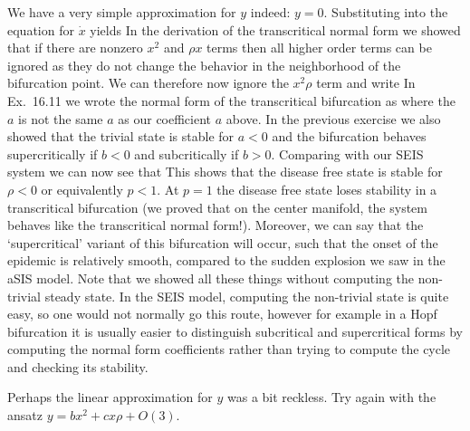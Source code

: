 \solution 
We have a very simple approximation for $y$ indeed: $y=0$. Substituting into the equation for $\dot{x}$ yields 
In the derivation of the transcritical normal form we showed that if there are nonzero $x^2$ and $\rho x$ terms then all higher order terms can be ignored as they do not change the behavior in the neighborhood of the bifurcation point. We can therefore now ignore the $x^2\rho$ term and write 
In Ex.~16.11 we wrote the normal form of the transcritical bifurcation as 
where the $a$ is not the same $a$ as our coefficient $a$ above. 
In the previous exercise we also showed that the trivial state is stable for $a<0$ and the bifurcation behaves supercritically if $b<0$ and subcritically if $b>0$. Comparing with our SEIS system we can now see that
This shows that the disease free state is stable for $\rho<0$ or equivalently $p<1$. At $p=1$ the disease free state loses stability in a transcritical bifurcation (we proved that on the center manifold, the system behaves like the transcritical normal form!). Moreover, we can say that the `supercritical' variant of this bifurcation will occur, such that the onset of the epidemic is relatively smooth, compared to the sudden explosion we saw in the aSIS model. 
Note that we showed all these things without computing the non-trivial steady state. In the SEIS model, computing the non-trivial state is quite easy, so one would not normally go this route, however for example in a Hopf bifurcation it is usually easier to distinguish subcritical and supercritical forms by computing the normal form coefficients rather than trying to compute the cycle and checking its stability.  

\subquestion 
Perhaps the linear approximation for $y$ was a bit reckless. Try again with the ansatz $y=bx^2+cx\rho + O(3)$.

